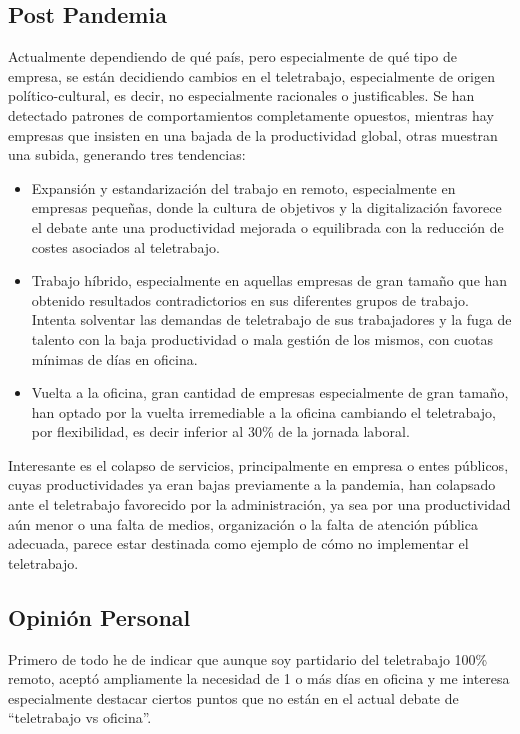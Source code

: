 \subsection{Post Pandemia}
Actualmente dependiendo de qué país, pero especialmente de qué tipo de empresa, se están decidiendo cambios en el teletrabajo, especialmente de origen político-cultural, es decir, no especialmente racionales o justificables. Se han detectado patrones de comportamientos completamente opuestos, mientras hay empresas que insisten en una bajada de la productividad global, otras muestran una subida, generando tres tendencias:
\begin{itemize}
    \item Expansión y estandarización del trabajo en remoto, especialmente en empresas pequeñas, donde la cultura de objetivos y la digitalización favorece el debate ante una productividad mejorada o equilibrada con la reducción de costes asociados al teletrabajo. 

    \item Trabajo híbrido, especialmente en aquellas empresas de gran tamaño que han obtenido resultados contradictorios en sus diferentes grupos de trabajo. Intenta solventar las demandas de teletrabajo de sus trabajadores y la fuga de talento con la baja productividad o mala gestión de los mismos, con cuotas mínimas de días en oficina.

    \item Vuelta a la oficina, gran cantidad de empresas especialmente de gran tamaño, han optado por la vuelta irremediable a la oficina cambiando el teletrabajo, por flexibilidad, es decir inferior al 30\% de la jornada laboral.

\end{itemize}
Interesante es el colapso de servicios, principalmente en empresa o entes públicos, cuyas productividades ya eran bajas previamente a la pandemia,  han colapsado ante el teletrabajo favorecido por la administración, ya sea por una productividad aún menor o una falta de medios, organización o la falta de atención pública adecuada, parece estar destinada como ejemplo de cómo no implementar el teletrabajo.

\subsection{Opinión Personal}
Primero de todo he de indicar que aunque soy partidario del teletrabajo 100\% remoto, aceptó ampliamente la necesidad de 1 o más días en oficina y me interesa especialmente destacar ciertos puntos que no están en el actual debate de “teletrabajo vs oficina”.

